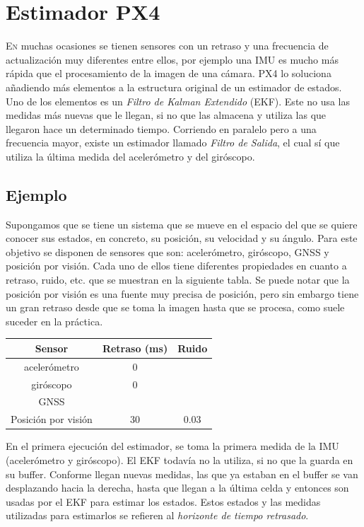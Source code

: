 \chapter{Estimador PX4}\label{chp-01}

\lettrine[lraise=-0.1, lines=2, loversize=0.2]{E}{n} muchas ocasiones se tienen sensores con un retraso y una frecuencia de actualización muy diferentes entre ellos, por ejemplo una IMU es mucho más rápida que el procesamiento de la imagen de una cámara. PX4 lo soluciona añadiendo más elementos a la estructura original de un estimador de estados. Uno de los elementos es un \textit{Filtro de Kalman Extendido} (EKF). Este no usa las medidas más nuevas que le llegan, si no que las almacena y utiliza las que llegaron hace un determinado tiempo. Corriendo en paralelo pero a una frecuencia mayor, existe un estimador llamado \textit{Filtro de Salida}, el cual sí que utiliza la última medida del acelerómetro y del giróscopo. 

\section{Ejemplo}
Supongamos que se tiene un sistema que se mueve en el espacio del que se quiere conocer sus estados, en concreto, su posición, su velocidad y su ángulo. Para este objetivo se disponen de sensores que son: acelerómetro, giróscopo, GNSS y posición por visión. Cada uno de ellos tiene diferentes propiedades en cuanto a retraso, ruido, etc. que se muestran en la siguiente tabla. Se puede notar que la posición por visión es una fuente muy precisa de posición, pero sin embargo tiene un gran retraso desde que se toma la imagen hasta que se procesa, como suele suceder en la práctica. 

\begin{tabular}{|c|c|c|}
Sensor			& Retraso (ms) 	& Ruido 	\\ \hline 
acelerómetro 		& 0 		& 	      	\\ 
giróscopo 		& 0 		& 	      	\\ 
GNSS      		& 		& 	      	\\ %
Posición por visión 	& 30 		& 0.03 	
\end{tabular}


En el primera ejecución del estimador, se toma la primera medida de la IMU (acelerómetro y giróscopo). El EKF todavía no la utiliza, si no que la guarda en su buffer. Conforme llegan nuevas medidas, las que ya estaban en el buffer se van desplazando hacia la derecha, hasta que llegan a la última celda y entonces son usadas por el EKF para estimar los estados. Estos estados y las medidas utilizadas para estimarlos se refieren al \textit{horizonte de tiempo retrasado}. 

